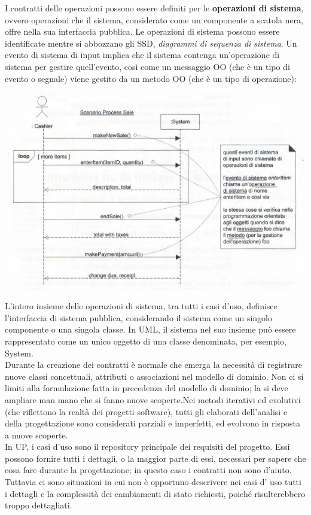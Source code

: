 \documentclass[a4paper,12pt, oneside]{book}
\begin{document}
I contratti delle operazioni possono essere definiti per le \textbf{operazioni di sistema}, ovvero operazioni che il sistema, considerato come un componente a scatola nera, offre nella sua interfaccia pubblica. Le operazioni di sistema possono essere identificate mentre si abbozzano gli SSD, \textit{diagrammi di sequenza di sistema}.
\newpage
Un evento di sistema di input implica che il sistema contenga un'operazione di sistema per gestire quell'evento,
così come un messaggio OO (che è un tipo di evento o segnale) viene gestito da un metodo OO (che è un tipo di operazione):
\begin{center}
	\includegraphics[scale=0.7]{img/oo.png}
\end{center}
L'intero insieme delle operazioni di sistema, tra tutti i casi d'uso, definisce l'interfaccia
di sistema pubblica, considerando il sistema come un singolo componente o una singola classe. In UML, il sistema nel suo insieme può essere rappresentato come un unico oggetto di una classe denominata, per esempio, System.\\
Durante la creazione dei contratti è normale che emerga la necessità di registrare nuove classi concettuali, attributi o associazioni nel modello di dominio. Non ci si limiti alla formulazione fatta in precedenza del modello di dominio; la si deve ampliare man mano che si fanno nuove scoperte.Nei metodi iterativi ed evolutivi (che riflettono la realtà dei progetti software), tutti gli elaborati dell'analisi e della progettazione sono considerati parziali e imperfetti, ed evolvono in risposta a nuove scoperte.\\
In UP, i casi d'uso sono il repository principale dei requisiti del progetto. Essi possono fornire tutti i dettagli, o la maggior parte di essi, necessari per sapere che cosa fare durante la progettazione; in questo caso i contratti non sono d'aiuto. Tuttavia ci sono situazioni in cui non è opportuno descrivere nei casi d' uso tutti i dettagli e la complessità dei cambiamenti di stato richiesti, poiché risulterebbero troppo dettagliati.
\end{document}
